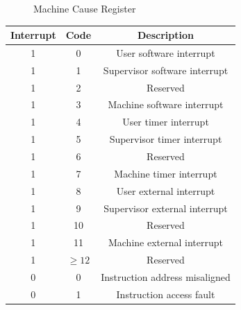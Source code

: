 \begin{figure}[htbp]
  \centering
  \def\stackalignment{r} %
  {\scriptsize }
  \caption{Machine Cause Register}
  \label{fig:mcause}
\end{figure}

\begin{table}
  \centering
  \begin{tabular}{|c|c|c|}
    \hline
    \textbf{Interrupt} & \textbf{Code} & \textbf{Description}           \\
    \hline
    1                  & 0             & User software interrupt        \\
    \hline
    1                  & 1             & Supervisor software interrupt  \\
    \hline
    1                  & 2             & Reserved                       \\
    \hline
    1                  & 3             & Machine software interrupt     \\
    \hline
    1                  & 4             & User timer interrupt           \\
    \hline
    1                  & 5             & Supervisor timer interrupt     \\
    \hline
    1                  & 6             & Reserved                       \\
    \hline
    1                  & 7             & Machine timer interrupt        \\
    \hline
    1                  & 8             & User external interrupt        \\
    \hline
    1                  & 9             & Supervisor external interrupt  \\
    \hline
    1                  & 10            & Reserved                       \\
    \hline
    1                  & 11            & Machine external interrupt     \\
    \hline
    1                  & $\geq 12$     & Reserved                       \\
    \hline
    0                  & 0             & Instruction address misaligned \\
    \hline
    0                  & 1             & Instruction access fault       \\

\end{tabular}
\end{table}
